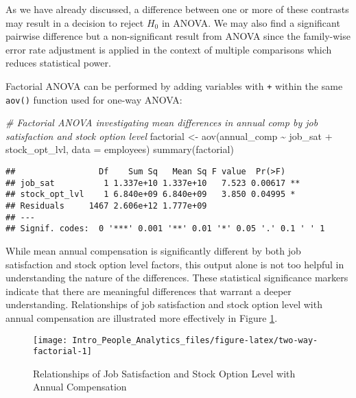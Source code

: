 \documentclass[
]{book}
\newenvironment{Shaded}{\begin{snugshade}}{\end{snugshade}}
\newcommand{\AttributeTok}[1]{\textcolor[rgb]{0.77,0.63,0.00}{#1}}
\newcommand{\CommentTok}[1]{\textcolor[rgb]{0.56,0.35,0.01}{\textit{#1}}}
\newcommand{\FunctionTok}[1]{\textcolor[rgb]{0.00,0.00,0.00}{#1}}
\newcommand{\NormalTok}[1]{#1}
\newcommand{\OtherTok}[1]{\textcolor[rgb]{0.56,0.35,0.01}{#1}}
\newcommand{\SpecialCharTok}[1]{\textcolor[rgb]{0.00,0.00,0.00}{#1}}
\begin{document}
As we have already discussed, a difference between one or more of these contrasts may result in a decision to reject \(H_0\) in ANOVA. We may also find a significant pairwise difference but a non-significant result from ANOVA since the family-wise error rate adjustment is applied in the context of multiple comparisons which reduces statistical power.

Factorial ANOVA can be performed by adding variables with \texttt{+} within the same \texttt{aov()} function used for one-way ANOVA:

\begin{Shaded}
\begin{Highlighting}[]
\CommentTok{\# Factorial ANOVA investigating mean differences in annual comp by job satisfaction and stock option level}
\NormalTok{factorial }\OtherTok{\textless{}{-}} \FunctionTok{aov}\NormalTok{(annual\_comp }\SpecialCharTok{\textasciitilde{}}\NormalTok{ job\_sat }\SpecialCharTok{+}\NormalTok{ stock\_opt\_lvl, }\AttributeTok{data =}\NormalTok{ employees)}
\FunctionTok{summary}\NormalTok{(factorial)}
\end{Highlighting}
\end{Shaded}

\begin{verbatim}
##                 Df    Sum Sq   Mean Sq F value  Pr(>F)   
## job_sat          1 1.337e+10 1.337e+10   7.523 0.00617 **
## stock_opt_lvl    1 6.840e+09 6.840e+09   3.850 0.04995 * 
## Residuals     1467 2.606e+12 1.777e+09                   
## ---
## Signif. codes:  0 '***' 0.001 '**' 0.01 '*' 0.05 '.' 0.1 ' ' 1
\end{verbatim}

While mean annual compensation is significantly different by both job satisfaction and stock option level factors, this output alone is not too helpful in understanding the nature of the differences. These statistical significance markers indicate that there are meaningful differences that warrant a deeper understanding. Relationships of job satisfaction and stock option level with annual compensation are illustrated more effectively in Figure \ref{fig:two-way-factorial}.

\begin{figure}

{\centering \texttt{[image: Intro\_People\_Analytics\_files/figure-latex/two-way-factorial-1]} 

}

\caption{Relationships of Job Satisfaction and Stock Option Level with Annual Compensation}\label{fig:two-way-factorial}
\end{figure}
\end{document}
